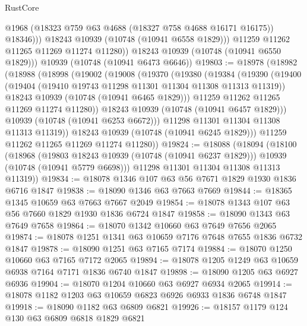 \begin{lexlean}{RustCore}
\begin{coremodule}
                  @1968
                  (@18323 @759 @63 @4688 (@18327 @758 @4688 @16171 @16175))
                  @18346)))
            @18243
            @10939
            (@10748 (@10941 @6558 @1829)))
          @11259
          @11262
          @11265
          @11269
          @11274
          @11280))
      @18243
      @10939
      (@10748 (@10941 @6550 @1829)))
    @10939
    (@10748 (@10941 @6473 @6646))
@19803 := @18978
    (@18982
      (@18988
        (@18998
          (@19002
            (@19008
              (@19370
                (@19380
                  (@19384
                    (@19390
                      (@19400
                        (@19404 (@19410 @19743 @11298 @11301 @11304 @11308 @11313 @11319))
                        @18243
                        @10939
                        (@10748 (@10941 @6465 @1829)))
                      @11259
                      @11262
                      @11265
                      @11269
                      @11274
                      @11280))
                  @18243
                  @10939
                  (@10748 (@10941 @6457 @1829)))
                @10939
                (@10748 (@10941 @6253 @6672)))
              @11298
              @11301
              @11304
              @11308
              @11313
              @11319))
          @18243
          @10939
          (@10748 (@10941 @6245 @1829)))
        @11259
        @11262
        @11265
        @11269
        @11274
        @11280))
@19824 := @18088
    (@18094
      (@18100
        (@18968
          (@19803 @18243 @10939 (@10748 (@10941 @6237 @1829)))
          @10939
          (@10748 (@10941 @5779 @6698)))
        @11298
        @11301
        @11304
        @11308
        @11313
        @11319))
@19834 := @18078 @1346 @107 @63 @56 @7671 @1829 @1930 @1836 @6716 @1847
@19838 := @18090 @1346 @63 @7663 @7669
@19844 := @18365 @1345 @10659 @63 @7663 @7667 @2049
@19854 := @18078 @1343 @107 @63 @56 @7660 @1829 @1930 @1836 @6724 @1847
@19858 := @18090 @1343 @63 @7649 @7658
@19864 := @18070 @1342 @10660 @63 @7649 @7656 @2065
@19874 := @18078 @1251 @1341 @63 @10659 @7176 @7648 @7655 @1836 @6732 @1847
@19878 := @18090 @1251 @63 @7165 @7174
@19884 := @18070 @1250 @10660 @63 @7165 @7172 @2065
@19894 := @18078 @1205 @1249 @63 @10659 @6938 @7164 @7171 @1836 @6740 @1847
@19898 := @18090 @1205 @63 @6927 @6936
@19904 := @18070 @1204 @10660 @63 @6927 @6934 @2065
@19914 := @18078 @1182 @1203 @63 @10659 @6823 @6926 @6933 @1836 @6748 @1847
@19918 := @18090 @1182 @63 @6809 @6821
@19926 := @18157 @1179 @124 @130 @63 @6809 @6818 @1829 @6821

\end{coremodule}
\end{lexlean}
